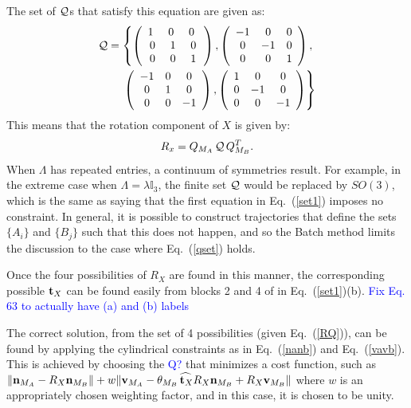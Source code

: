 \documentclass[twocolumn,10pt]{asme2ej}
\begin{document}
The set of ${\cal Q}$s that satisfy this equation are given as:
\begin{equation}
\begin{split}
{\cal Q} = \left\{ \left(\begin{array}{ccc}
1\,\, & 0 \,\, & 0 \,\, \\
0 & 1 & 0\\
0 & 0 & 1 \end{array}\right) , \left(\begin{array}{ccc}
-1 & 0 & 0 \\
0 & -1 & 0\\
0 & 0 & 1 \end{array}\right), \right.\\
\left. \left(\begin{array}{ccc}
-1 & 0 & 0 \\
0 & 1 & 0\\
0 & 0 & -1 \end{array}\right), \left(\begin{array}{ccc}
1 & 0 & 0 \\
0 & -1 & 0\\
0 & 0 & -1 \end{array}\right)\right\}
\end{split} 
\label{qset}
\end{equation}
This means that the rotation component of $X$ is given by:
\begin{equation}
R_x=Q_{M_A}\,{\cal Q}\,Q_{M_B}^T.
\label{RQ}\end{equation}
When $\Lambda$ has repeated entries, a continuum of symmetries result. For example, in the extreme case when $\Lambda = \lambda \mathbb{I}_3$, the
finite set ${\cal Q}$ would be replaced by $SO(3)$, which is the same as saying that the first equation in Eq.~(\ref{set1}) imposes no constraint. In general, it is possible to construct trajectories that define the sets $\{A_i\}$ and $\{B_j\}$ such that this does not happen, and so the Batch method limits the discussion to the case where Eq.~(\ref{qset}) holds.

Once the four possibilities of $R_X$ are found in this manner, the corresponding possible ${\bf t}_X$ can be found easily from blocks 2 and 4 of in Eq.~(\ref{set1})(b). \textcolor{blue}{Fix Eq. 63 to actually have (a) and (b) labels}

The correct solution, from the set of 4 possibilities (given Eq.~(\ref{RQ})), can be found by applying the cylindrical constraints as in Eq.~(\ref{nanb}) and Eq.~(\ref{vavb}). This is achieved by choosing the \textcolor{blue}{Q?} %
that minimizes a cost function, such as $\| {\bf n}_{M_A}-R_X {\bf n}_{M_B} \|+w \| {\bf v}_{M_A} - \theta_{M_B} \widehat{\,{\bf t}_X} R_X {\bf n}_{M_B} + R_X {\bf v}_{M_B} \|$
where $w$ is an appropriately chosen weighting factor, and in this case, it is chosen to be unity.
\end{document}
